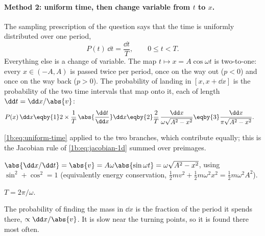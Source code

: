 \paragraph{Method 2: uniform time, then change variable from $t$ to $x$.}
The sampling prescription of the question says that the time is uniformly
distributed over one period,
\begin{equation}
  P(t)\,\dd t=\frac{\dd t}{T},\qquad 0\le t<T .
  \label{1b:eq:uniform-time}
\end{equation}
Everything else is a change of variable. The map $t\mapsto x=A\cos\omega t$ is
two-to-one: every $x\in(-A,A)$ is passed twice per period, once on the way out
($p<0$) and once on the way back ($p>0$). The probability of landing in
$[x,x+\dd x]$ is the probability of the two time intervals that map onto it,
each of length $\dd t=\dd x/\abs{v}$:
\begin{align*}
  P(x)\,\dd x
  &\eqby{1} 2\times\frac{1}{T}\,\abs{\frac{\dd t}{\dd x}}\dd x
   \eqby{2} \frac{2}{T}\,\frac{\dd x}{\omega\sqrt{A^2-x^2}}
   \eqby{3} \frac{\dd x}{\pi\sqrt{A^2-x^2}} .
\end{align*}
\begin{explain}
  \item \eqref{1b:eq:uniform-time} applied to the two branches, which contribute
        equally; this is the Jacobian rule of \cref{1b:eq:jacobian-1d} summed over preimages.
  \item $\abs{\dd x/\dd t}=\abs{v}=A\omega\abs{\sin\omega t}=\omega\sqrt{A^2-x^2}$,
        using $\sin^2+\cos^2=1$ (equivalently energy conservation,
        $\tfrac12mv^2+\tfrac12m\omega^2x^2=\tfrac12m\omega^2A^2$).
  \item $T=2\pi/\omega$.
\end{explain}
The probability of finding the mass in $\dd x$ is the fraction of the
period it spends there, $\propto\dd x/\abs{v}$. It is slow near the turning
points, so it is found there most often.

